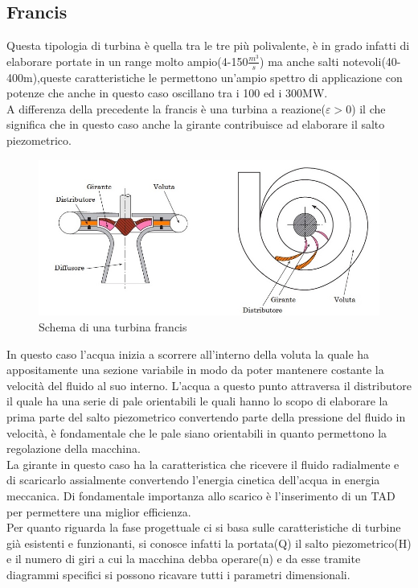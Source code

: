 \subsection{Francis}
Questa tipologia di turbina è quella tra le tre più polivalente, è in grado infatti di elaborare portate in un range molto ampio(4-150$\frac{m^3}{s}$) ma anche salti notevoli(40-400m),queste caratteristiche le permettono un'ampio spettro di applicazione con potenze che anche in questo caso oscillano tra i 100 ed i 300MW.\\
A differenza della precedente la francis è una turbina a reazione($\varepsilon>0$) il che significa che in questo caso anche la girante contribuisce ad elaborare il salto piezometrico.
\begin{figure}[H]
    \centering
    \includegraphics[height=0.4\textwidth]{res/cap 3/francis}
    \caption{Schema di una turbina francis}
\end{figure}\noindent
In questo caso l'acqua inizia a scorrere all'interno della voluta la quale ha appositamente una sezione variabile in modo da poter mantenere costante la velocità del fluido al suo interno.
L'acqua a questo punto attraversa il distributore il quale ha una serie di pale orientabili le quali hanno lo scopo di elaborare la prima parte del salto piezometrico convertendo parte della pressione del fluido in velocità, è fondamentale che le pale siano orientabili in quanto permettono la regolazione della macchina.\\
La girante in questo caso ha la caratteristica che ricevere il fluido radialmente e di scaricarlo assialmente convertendo l'energia cinetica dell'acqua in energia meccanica.
Di fondamentale importanza allo scarico è l'inserimento di un TAD per permettere una miglior efficienza.\\
Per quanto riguarda la fase progettuale ci si basa sulle caratteristiche di turbine già esistenti e funzionanti, si conosce infatti la portata(Q) il salto piezometrico(H) e il numero di giri a cui la macchina debba operare(n) e da esse tramite diagrammi specifici si possono ricavare tutti i parametri dimensionali.
\newpage
